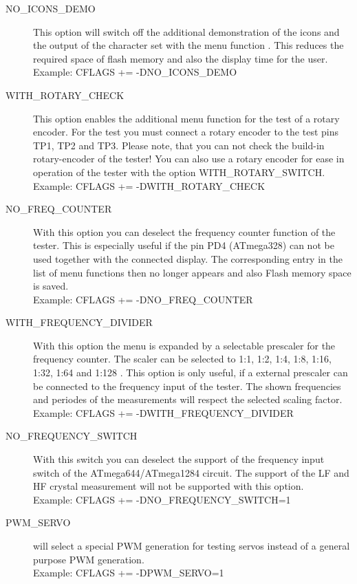 \begin{description}
 \item[NO\_ICONS\_DEMO]
This option will switch off the additional demonstration of the icons and the output of the character set with
the menu function .
This reduces the required space of flash memory  and also the display time for the user.\\
Example: CFLAGS += -DNO\_ICONS\_DEMO

 \item[WITH\_ROTARY\_CHECK]
This option enables the additional menu function for the test of a rotary encoder.
For the test you must connect a rotary encoder to the test pins TP1, TP2 and TP3.
Please note, that you can not check the build-in rotary-encoder of the tester!
You can also use a rotary encoder for ease in operation of the tester with the option WITH\_ROTARY\_SWITCH.\\
Example: CFLAGS += -DWITH\_ROTARY\_CHECK

 \item[NO\_FREQ\_COUNTER]
With this option you can deselect the frequency counter function of the tester.
This is especially useful if the pin PD4 (ATmega328) can not be used together with the
connected display.
The corresponding entry in the list of menu functions then no longer appears and also
Flash memory space is saved.\\
Example: CFLAGS += -DNO\_FREQ\_COUNTER

 \item[WITH\_FREQUENCY\_DIVIDER]
With this option the menu is expanded by a selectable prescaler for the frequency counter.
The scaler can be selected to 1:1, 1:2, 1:4, 1:8, 1:16, 1:32, 1:64 and 1:128 .
This option is only useful, if a external prescaler can be connected to the frequency input of the tester.
The shown frequencies and periodes of the measurements will respect the selected scaling factor.\\
Example: CFLAGS += -DWITH\_FREQUENCY\_DIVIDER

 \item[NO\_FREQUENCY\_SWITCH]
With this switch you can deselect the support of the frequency input switch of the ATmega644/ATmega1284 circuit.
The support of the LF and HF crystal measurement will not be supported with this option.\\
Example: CFLAGS += -DNO\_FREQUENCY\_SWITCH=1

\item[PWM\_SERVO] 
will select a special PWM generation for testing servos instead of a general purpose PWM generation.\\
Example: CFLAGS += -DPWM\_SERVO=1


\end{description}
